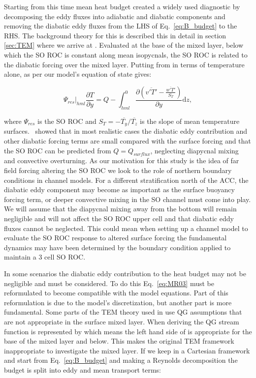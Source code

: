 Starting from this time mean heat budget \citet{Marshall2003} created a widely used diagnostic by decomposing the eddy fluxes into adiabatic and diabatic components and removing the diabatic eddy fluxes from the LHS of Eq.~\ref{eq:B_budget} to the RHS. The background theory for this is described this in detail in section \ref{sec:TEM} where we arrive at . Evaluated at the base of the mixed layer, below which the SO ROC is constant along mean isopycnals, the SO ROC is related to the diabatic forcing over the mixed layer. Putting  from \cite{Marshall2003} in terms of temperature alone, as per our model's equation of state gives:

\begin{equation}
 \Psi_{res} |_{hml} \frac{\partial T}{\partial y} =  Q - \int_{hml}^{0} \frac{\partial \left(\overline{v'T'} - \frac{\overline{w'T'}}{S_T} \right)}{\partial y } \mathrm{d}z,
 \label{eq:MR03}
\end{equation}

 where $\Psi_{res}$ is the SO ROC and $S_T=-\overline{T_y}/\overline{T_z}$ is the slope of mean temperature surfaces.~\citet{Marshall2003} showed that in most realistic cases the diabatic eddy contribution and other diabatic forcing terms are small compared with the surface forcing and that the SO ROC can be predicted from $Q=Q_{surflux}$, neglecting diapycnal mixing and convective overturning. As our motivation for this study is the idea of far field forcing altering the SO ROC we look to the role of northern boundary conditions in channel models.
 For a different stratification north of the ACC, the diabatic eddy component may become as important as the surface buoyancy forcing term, or deeper convective mixing in the SO channel must come into play. We will assume that the diapycnal mixing away from the bottom will remain negligible and will not affect the SO ROC upper cell and that diabatic eddy fluxes cannot be neglected. This could mean when setting up a channel model to evaluate the SO ROC response to altered surface forcing the fundamental dynamics may have been determined by the boundary condition applied to maintain a 3 cell SO ROC.

In some scenarios the diabatic eddy contribution to the heat budget may not be negligible and must be considered. To do this Eq.~\ref{eq:MR03} must be reformulated to become compatible with the model equations. Part of this reformulation is due to the model's discretization, but another part is more fundamental. Some parts of the TEM theory used in \citet{Marshall2003} use QG assumptions that are not appropriate in the surface mixed layer. When deriving  the QG stream function is represented by  which means the left hand side of  is appropriate for the base of the mixed layer and below. This makes the original TEM framework inappropriate to investigate the mixed layer.  If we keep in a Cartesian framework and start from Eq.~\ref{eq:B_budget} and making a Reynolds decomposition the budget is split into eddy and mean transport terms: 

